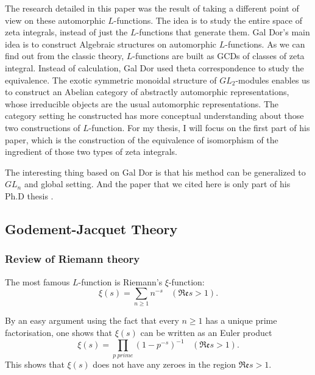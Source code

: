 \documentclass[12pt,a4paper,english]{article}
\theoremstyle{plain}
\theoremstyle{definition}
\begin{document}
The research detailed in this paper was the result of taking a different point
of view on these automorphic $L$-functions. The idea is to study the entire space
of zeta integrals, instead of just the $L$-functions that generate them. Gal Dor's main idea is to construct Algebraic structures on automorphic $L$-functions. As we can find out from the classic theory, $L$-functions are built as GCDs of classes of zeta integral. Instead of calculation, Gal Dor used theta correspondence to study the equivalence.  The exotic symmetric monoidal
structure of $GL_{2}$-modules enables us to construct an Abelian category of abstractly
automorphic representations, whose irreducible objects are the usual automorphic representations. The category setting he constructed has more conceptual understanding about those two constructions of $L$-function. For my thesis, I will focus on the first part of his paper, which is the construction of the equivalence of isomorphism of the ingredient of those two types of zeta integrals.

The interesting thing based on Gal Dor is that his method can be generalized to $GL_{n}$ and global setting. And the paper that we cited here is only part of his Ph.D thesis \cite{dor2020exotic}.
\subsection{Godement-Jacquet Theory}
\subsubsection{Review of Riemann theory}
The most famous $L$-function is Riemann's $\xi$-function:
\begin{equation*}
    \xi(s)=\sum_{n\geq 1}n^{-s}\ \ \ \ (\mathfrak{Re}s> 1).
\end{equation*}

By an easy argument using the fact that every $n\geq 1$ has a unique prime factorisation, one shows that $\xi(s)$ can be written as an Euler product
\begin{equation*}
    \xi(s)=\prod_{p\ prime} (1-p^{-s})^{-1}\ \ \ \ (\mathfrak{Re}s >1).
\end{equation*}
This shows that $\xi(s)$ does not have any zeroes in the region $\mathfrak{Re}s >1$.
\end{document}
